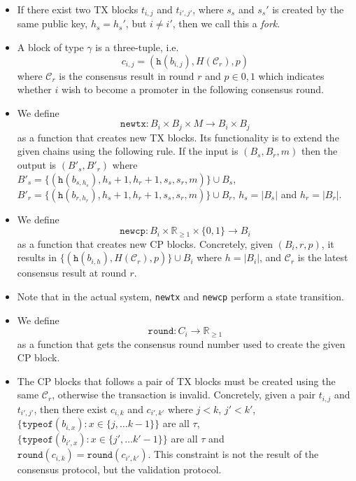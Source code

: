 \begin{itemize}
\item If there exist two TX blocks $t_{i,j}$ and $t_{i',j'}$, where $s_s$ and
  $s_s'$ is created by the same public key, $h_s = h_s'$, but $i \neq i'$, then
  we call this a \emph{fork}.

\item A block of type $\gamma$ is a three-tuple, i.e.
  $$c_{i,j} = (\texttt{h}(b_{i,j}), H(\mathcal{C}_r), p)$$
  where $\mathcal{C}_r$ is the consensus result in round $r$ and $p \in {0,1}$
  which indicates whether $i$ wish to become a promoter in the following
  consensus round.

\item We define
  $$\texttt{newtx}: B_i \times B_j \times M \rightarrow B_i \times B_j$$
  as a function that creates new TX blocks. Its functionality is to
  extend the given chains using the following rule. If the input is $(B_s, B_r,
  m)$ then the output is $(B'_s, B'_r)$ where $B'_s = \{(\texttt{h}(b_{s,h_s}), h_s + 1,
  h_r + 1, s_s, s_r, m)\} \cup B_s$, $B'_r = \{(\texttt{h}(b_{r, h_r}), h_s + 1, h_r + 1,
  s_s, s_r, m)\} \cup B_r$, $h_s = |B_s|$ and $h_r = |B_r|$.

\item We define
  $$\texttt{newcp}: B_i \times \mathbb{R}_{\ge 1} \times \{0, 1\} \rightarrow B_i$$
  as a function that creates new CP blocks. Concretely, given $(B_i, r, p)$, it
  results in $\{ (\texttt{h}(b_{i,h}), H(\mathcal{C}_r), p) \}\cup B_i$ where $h =
  |B_i|$, and $\mathcal{C}_r$ is the latest consensus result at round $r$.

\item Note that in the actual system, \texttt{newtx} and \texttt{newcp} perform
  a state transition.

\item We define
  $$\texttt{round}: C_i \rightarrow \mathbb{R}_{\ge 1}$$
  as a function that gets the consensus round number used to create the given CP
  block.

\item The CP blocks that follows a pair of TX blocks must be created using the
  same $\mathcal{C}_r$, otherwise the transaction is invalid. Concretely, given
  a pair $t_{i,j}$ and $t_{i',j'}$, then there exist $c_{i, k}$ and $c_{i', k'}$
  where $j < k$, $j' < k'$, $\{ \texttt{typeof}(b_{i, x}) : x \in \{j, \dots k -
  1\}\}$ are all $\tau$, $ \{ \texttt{typeof}(b_{i', x}) : x \in \{ j', \dots k'
  - 1\} \}$ are all $\tau$ and $\texttt{round}(c_{i, k}) = \texttt{round}(c_{i',
    k'})$. This constraint is not the result of the consensus protocol, but the
  validation protocol.


\end{itemize}
